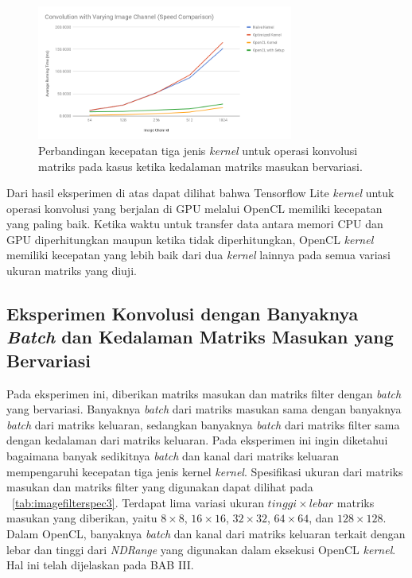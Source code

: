 \begin{figure}
	\centering
	\includegraphics[width=0.75\textwidth]
	{pics/convvarchn.png}
	\caption{Perbandingan kecepatan tiga jenis \textit{kernel} untuk operasi konvolusi matriks pada kasus ketika kedalaman matriks masukan bervariasi.}
	\label{fig:convvarchn}
\end{figure}

Dari hasil eksperimen di atas dapat dilihat bahwa Tensorflow Lite \textit{kernel} untuk operasi konvolusi yang berjalan di GPU melalui OpenCL memiliki kecepatan yang paling baik. Ketika waktu untuk transfer data antara memori CPU dan GPU diperhitungkan maupun ketika tidak diperhitungkan, OpenCL \textit{kernel} memiliki kecepatan yang lebih baik dari dua \textit{kernel} lainnya pada semua variasi ukuran matriks yang diuji.

\subsection{Eksperimen Konvolusi dengan Banyaknya \textit{Batch} dan Kedalaman Matriks Masukan yang Bervariasi}
Pada eksperimen ini, diberikan matriks masukan dan matriks filter dengan \textit{batch} yang bervariasi. Banyaknya \textit{batch} dari matriks masukan sama dengan banyaknya \textit{batch} dari matriks keluaran, sedangkan banyaknya \textit{batch} dari matriks filter sama dengan kedalaman dari matriks keluaran. Pada eksperimen ini ingin diketahui bagaimana banyak sedikitnya \textit{batch} dan kanal dari matriks keluaran mempengaruhi kecepatan tiga jenis kernel \textit{kernel}. Spesifikasi ukuran dari matriks masukan dan matriks filter yang digunakan dapat dilihat pada \tab~\ref{tab:imagefilterspec3}. Terdapat lima variasi ukuran $tinggi \times lebar$ matriks masukan yang diberikan, yaitu $8 \times 8$, $16 \times 16$, $32 \times 32$, $64 \times 64$, dan $128 \times 128$. Dalam OpenCL, banyaknya \textit{batch} dan kanal dari matriks keluaran terkait dengan lebar dan tinggi dari \textit{NDRange} yang digunakan dalam eksekusi OpenCL \textit{kernel}. Hal ini telah dijelaskan pada BAB III.

